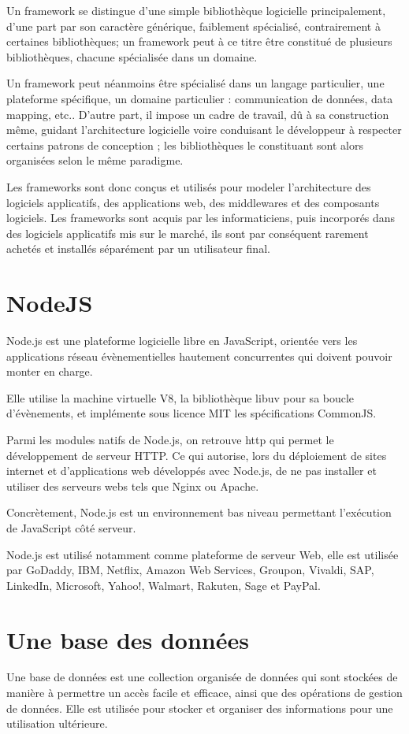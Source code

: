 Un framework se distingue d'une simple bibliothèque logicielle principalement,
d'une part par son caractère générique, faiblement spécialisé, contrairement à
certaines bibliothèques; un framework peut à ce titre être constitué de plusieurs
bibliothèques, chacune spécialisée dans un domaine.

Un framework peut néanmoins être spécialisé dans un langage particulier,
une plateforme spécifique, un domaine particulier : communication de données,
data mapping, etc.. D'autre part, il impose un cadre de travail, dû à sa construction même,
 guidant l'architecture logicielle voire conduisant le développeur à respecter certains
 patrons de conception ; les bibliothèques le constituant sont alors organisées selon le même paradigme.

Les frameworks sont donc conçus et utilisés pour modeler l'architecture des logiciels applicatifs,
des applications web, des middlewares et des composants logiciels. Les frameworks sont
acquis par les informaticiens, puis incorporés dans des logiciels applicatifs mis sur
le marché, ils sont par conséquent rarement achetés et installés séparément par un utilisateur final.

\section{NodeJS}\label{sec:nodejs}
Node.js est une plateforme logicielle libre en JavaScript, orientée vers les applications
réseau évènementielles hautement concurrentes qui doivent pouvoir monter en charge.

Elle utilise la machine virtuelle V8, la bibliothèque libuv pour sa boucle d'évènements,
et implémente sous licence MIT les spécifications CommonJS.

Parmi les modules natifs de Node.js, on retrouve http qui permet le développement de
serveur HTTP. Ce qui autorise, lors du déploiement de sites internet et d'applications
web développés avec Node.js, de ne pas installer et utiliser des serveurs webs tels que Nginx ou Apache.

Concrètement, Node.js est un environnement bas niveau permettant l'exécution de JavaScript côté serveur.

Node.js est utilisé notamment comme plateforme de serveur Web, elle est utilisée par GoDaddy, IBM,
Netflix, Amazon Web Services, Groupon, Vivaldi, SAP, LinkedIn, Microsoft, Yahoo!,
Walmart, Rakuten, Sage et PayPal.

\section{Une base des données}\label{sec:base-de-donnees}
Une base de données est une collection organisée de données qui sont stockées de manière à
permettre un accès facile et efficace, ainsi que des opérations de gestion de données.
Elle est utilisée pour stocker et organiser des informations pour une utilisation ultérieure.


